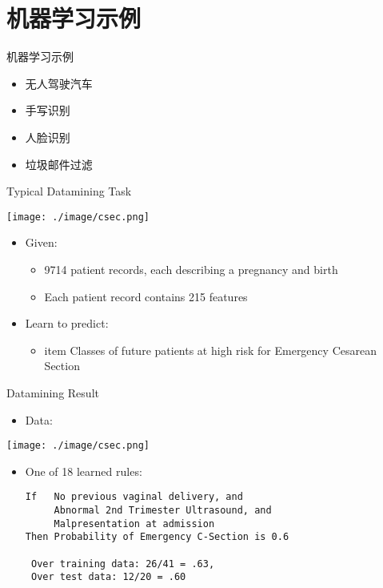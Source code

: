 \documentclass[presentation]{beamer}
\begin{document}
\section{机器学习示例}
\label{sec:org35fe2db}
\begin{frame}[label={sec:orgd8cd412}]{机器学习示例}
\begin{itemize}
\item 无人驾驶汽车
\item 手写识别
\item 人脸识别
\item 垃圾邮件过滤
\end{itemize}
\end{frame}

\begin{frame}[label={sec:org4c91e3f}]{Typical Datamining Task}
\begin{center}
\texttt{[image: ./image/csec.png]}
\end{center}

\begin{itemize}
\item Given:
\begin{itemize}
\item 9714 patient records, each describing a pregnancy and birth
\item Each patient record contains 215 features
\end{itemize}
\item Learn to predict:
\begin{itemize}
\item item Classes of future patients at high risk for Emergency Cesarean Section
\end{itemize}
\end{itemize}
\end{frame}

\begin{frame}[label={sec:orgd7b7397},fragile]{Datamining Result}
 \begin{itemize}
\item Data:
\end{itemize}

\begin{center}
\texttt{[image: ./image/csec.png]}
\end{center}

\begin{itemize}
\item One of 18 learned rules:
\begin{verbatim}
If   No previous vaginal delivery, and
     Abnormal 2nd Trimester Ultrasound, and
     Malpresentation at admission
Then Probability of Emergency C-Section is 0.6

 Over training data: 26/41 = .63, 
 Over test data: 12/20 = .60
\end{verbatim}
\end{itemize}
\end{frame}
\end{document}
